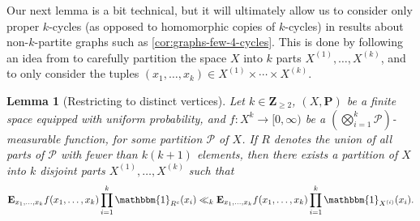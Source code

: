 \documentclass[reqno,11pt]{amsart}
\newtheorem{lemma}[theorem]{Lemma}
\theoremstyle{definition}
\theoremstyle{remark}
\newtheorem*{remark}{Remark}
\numberwithin{equation}{section}
\newcommand{\Z}{\mathbf{Z}}
\renewcommand{\P}{\mathbf{P}}
\newcommand{\E}{\mathbf{E}}
\newcommand{\mP}{\mathcal{P}}
\newcommand{\one}{\mathbbm{1}}
\begin{document}

Our next lemma is a bit technical, but it will ultimately allow us to consider only proper $k$-cycles (as opposed to homomorphic copies of $k$-cycles) in results about non-$k$-partite graphs such as \cref{cor:graphs-few-4-cycles}. This is done by following an idea from \cite{conlon2021regularity} to carefully partition the space $X$ into $k$ parts $X^{(1)}, \ldots, X^{(k)}$, and to only consider the tuples $(x_1, \ldots, x_k) \in X^{(1)} \times \cdots \times X^{(k)}$. 

\begin{lemma}[Restricting to distinct vertices] \label{lem:distinct-vertices}
Let $k \in \Z_{\ge 2}$, $(X, \P)$ be a finite space equipped with uniform probability, and $f : X^k \to [0,\infty)$ be a $(\bigotimes_{i=1}^k \mP)$-measurable function, for some partition $\mP$ of $X$. If $R$ denotes the union of all parts of $\mP$ with fewer than $k(k+1)$ elements, then there exists a partition of $X$ into $k$ disjoint parts $X^{(1)}, \ldots, X^{(k)}$ such that
\[
    \E_{x_1, \ldots, x_k} f(x_1,\ldots,x_k) \prod_{i=1}^k \one_{R^c}(x_i)
    \ll_k \E_{x_1, \ldots, x_k} f(x_1,\ldots,x_k) \prod_{i=1}^k\one_{X^{(i)}}(x_i).
\]
\end{lemma}
\end{document}
